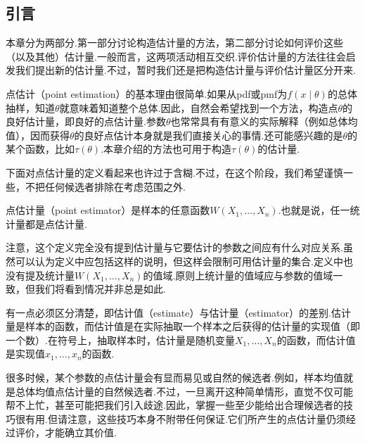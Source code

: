 \subsection{引言}\label{sec:7.1}
本章分为两部分.第一部分讨论构造估计量的方法，第二部分讨论如何评价这些（以及其他）估计量.一般而言，这两项活动相互交织.评价估计量的方法往往会启发我们提出新的估计量.不过，暂时我们还是把构造估计量与评价估计量区分开来.

点估计（point estimation）的基本理由很简单.如果从pdf或pmf为$f(x\mid\theta)$的总体抽样，知道$\theta$就意味着知道整个总体.因此，自然会希望找到一个方法，构造点$\theta$的良好估计量，即良好的点估计量.参数$\theta$也常常具有有意义的实际解释（例如总体均值），因而获得$\theta$的良好点估计本身就是我们直接关心的事情.还可能感兴趣的是$\theta$的某个函数，比如$\tau(\theta)$.本章介绍的方法也可用于构造$\tau(\theta)$的估计量.

下面对点估计量的定义看起来也许过于含糊.不过，在这个阶段，我们希望谨慎一些，不把任何候选者排除在考虑范围之外.
\begin{definition}\label{def:7.1.1}
点估计量（point estimator）是样本的任意函数$W(X_1,\ldots,X_n)$.也就是说，任一统计量都是点估计量.
\end{definition}
注意，这个定义完全没有提到估计量与它要估计的参数之间应有什么对应关系.虽然可以认为定义中应包括这样的说明，但这样会限制可用估计量的集合.定义中也没有提及统计量$W(X_1,\ldots,X_n)$的值域.原则上统计量的值域应与参数的值域一致，但我们将看到情况并非总是如此.

有一点必须区分清楚，即估计值（estimate）与估计量（estimator）的差别.估计量是样本的函数，而估计值是在实际抽取一个样本之后获得的估计量的实现值（即一个数）.在符号上，抽取样本时，估计量是随机变量$X_1,\ldots,X_n$的函数，而估计值是实现值$x_1,\ldots,x_n$的函数.

很多时候，某个参数的点估计量会有显而易见或自然的候选者.例如，样本均值就是总体均值点估计量的自然候选者.不过，一旦离开这种简单情形，直觉不仅可能帮不上忙，甚至可能把我们引入歧途.因此，掌握一些至少能给出合理候选者的技巧很有用.但请注意，这些技巧本身不附带任何保证.它们所产生的点估计量仍须经过评价，才能确立其价值.
